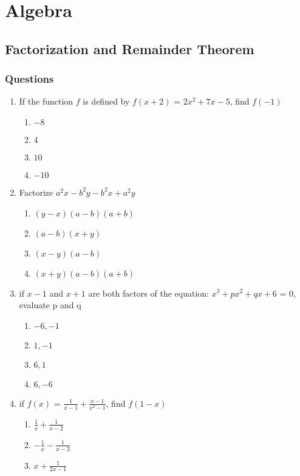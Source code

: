 \chapter{Algebra}
\section{Factorization and Remainder Theorem}
\subsection{Questions}
\begin{multicols}{2}
\begin{enumerate}[label={\arabic*.}]
\item If the function \(f\) is defined by \(f(x+2)\) = \(2x^2 + 7x -5\), find \(f(-1)\)
	\begin{enumerate}[label={\Alph*.}]
	\item \(-8\)
	\item \(4\)
	\item \(10\)
	\item \(-10\)
	\end{enumerate}
\item Factorize \(a^2x - b^2y - b^2x + a^2y\)
	\begin{enumerate}[label={\Alph*.}]
	\item \((y-x)(a-b)(a+b)\)
	\item \((a-b)(x+y)\)
	\item \((x-y)(a-b)\)
	\item \((x+y)(a-b)(a+b)\)
	\end{enumerate}
\item if \(x - 1\) and \(x + 1\) are both factors of the equation: \(x^3 + px^2 + qx + 6 \) = 0, 
evaluate p and q
	\begin{enumerate}[label={\Alph*.}]
	\item \(-6, -1\)
	\item \(1, -1\)
	\item \(6, 1\)
	\item \(6, -6\)
	\end{enumerate}
\item if \(f(x)\) = \(\frac{1}{x - 1} + \frac{x - 1}{x^2 - 1}\), find \(f(1 - x)\)
	\begin{enumerate}[label={\Alph*.}]
	\item \(\frac{1}{x} + \frac{1}{x - 2}\)
	\item \( -\frac{1}{x} - \frac{1}{x - 2}\)
	\item \(x + \frac{1}{2x - 1}\)

\end{enumerate}
\end{enumerate}
\end{multicols}
